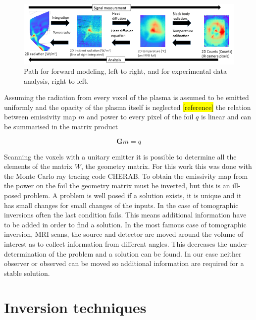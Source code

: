 \begin{figure}
	\centering
	\includegraphics[width=\linewidth]{Chapters/chapter2/figs/numerical_path.png}
	\caption{Path for forward modeling, left to right, and for experimental data analysis, right to left.}
	\label{fig:numerical_path}
\end{figure}

Assuming the radiation from every voxel of the plasma is assumed to be emitted uniformly and the opacity of the plasma itself is neglected \hl{[reference]} the relation between emissivity map $m$ and power to every pixel of the foil $q$ is linear and can be summarised in the matrix product

\begin{equation}
\bm{G}m=q
\label{eq:gmq}
\end{equation}

Scanning the voxels with a unitary emitter it is possible to determine all the elements of the matrix $W$, the geometry matrix. For this work this was done with the Monte Carlo ray tracing code CHERAB. To obtain the emissivity map from the power on the foil the geometry matrix must be inverted, but this is an ill-posed problem. A problem is well posed if a solution exists, it is unique and it has small changes for small changes of the inputs. \cite{Hansen1998} In the case of tomographic inversions often the last condition fails. \cite{Hansen2010} This means additional information have to be added in order to find a solution. In the most famous case of tomographic inversion, MRI scans, the source and detector are moved around the volume of interest as to collect information from different angles. This decreases the under-determination of the problem and a solution can be found. In our case neither observer or observed can be moved so additional information are required for a stable solution.
\section{Inversion techniques}
